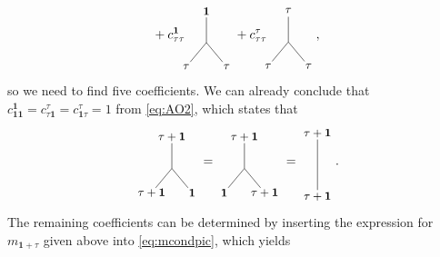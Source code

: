\begin{exmp}
\begin{enumerate}
\begin{equation}
\begin{tikzpicture}[scale=0.7,baseline=(current bounding box.center)]
					\end{tikzpicture}+c_{\tau\tau}^{\mathbf{1}}\hspace{-5pt}
					\begin{tikzpicture}[scale=0.7,baseline=(current bounding box.center)]
						\draw (0,0) to (90:1);
						\draw (0,0) to (230:1);
						\draw (0,0) to (310:1);	
						\node at (90:1.25) {\small $\mathbf{1}$};	
						\node at (230:1.25) {\small $\tau$};
						\node at (310:1.25) {\small $\tau$};
					\end{tikzpicture}+c_{\tau\tau}^{\tau}\hspace{-5pt}
					\begin{tikzpicture}[scale=0.7,baseline=(current bounding box.center)]
						\draw (0,0) to (90:1);
						\draw (0,0) to (230:1);
						\draw (0,0) to (310:1);	
						\node at (90:1.25) {\small $\tau$};	
						\node at (230:1.25) {\small $\tau$};
						\node at (310:1.25) {\small $\tau$};
					\end{tikzpicture},
				\end{equation}
				so we need to find five coefficients. We can already conclude that $c_{\mathbf{1}\mathbf{1}}^\mathbf{1}=c_{\tau\mathbf{1}}^\tau=c_{\mathbf{1}\tau}^\tau=1$ from \cref{eq:AO2}, which states that
				\begin{equation}
					\begin{tikzpicture}[scale=0.7,baseline=(current bounding box.center)]
						\draw (0,0) to (90:1);
						\draw (0,0) to (230:1);
						\draw (0,0) to (310:1);	
						\node at (90:1.25) {\small $\tau+\mathbf{1}$};	
						\node at (230:1.25) {\small $\tau+\mathbf{1}$};
						\node at (310:1.25) {\small $\mathbf{1}$};
					\end{tikzpicture}=
					\begin{tikzpicture}[scale=0.7,baseline=(current bounding box.center)]
						\draw (0,0) to (90:1);
						\draw (0,0) to (230:1);
						\draw (0,0) to (310:1);	
						\node at (90:1.25) {\small $\tau+\mathbf{1}$};	
						\node at (230:1.25) {\small $\mathbf{1}$};
						\node at (310:1.25) {\small $\tau+\mathbf{1}$};
					\end{tikzpicture}=
					\begin{tikzpicture}[scale=0.7,baseline=(current bounding box.center)]
						\draw (0,-1) to (0,1);
						\node at (0,1.25) {\small $\tau+\mathbf{1}$};	
						\node at (0,-1.25) {\small $\tau+\mathbf{1}$};
					\end{tikzpicture}.
				\end{equation}
				The remaining coefficients can be determined by inserting the expression for $m_{\mathbf{1}+\tau}$ given above into \cref{eq:mcondpic}, which yields

\end{enumerate}
\end{exmp}
